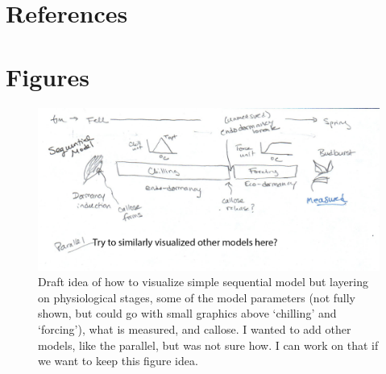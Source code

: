 \documentclass[11pt]{article}
\begin{document}

\clearpage

\section{References}



\clearpage
\section{Figures}

\begin{figure}[h!]
\includegraphics[width=1\textwidth]{..//figures/chillingmodel_drafttext.png}
\caption{Draft idea of how to visualize simple sequential model but layering on physiological stages, some of the model parameters (not fully shown, but could go with small graphics above `chilling' and `forcing'), what is measured, and callose. I wanted to add other models, like the parallel, but was not sure how. I can work on that if we want to keep this figure idea.} 
\label{fig:modelsketch}
\end{figure}
\end{document}
